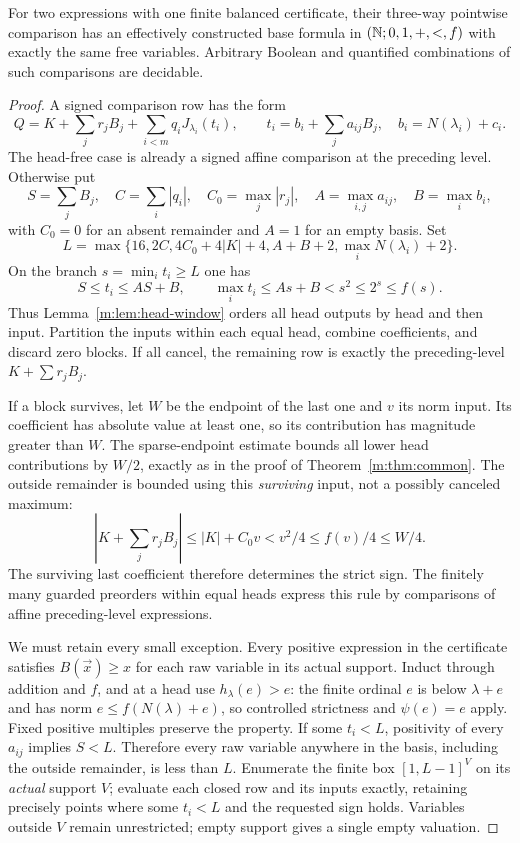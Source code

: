 \begin{theorem}\label{m:thm:balanced}
For two expressions with one finite balanced certificate, their three-way
pointwise comparison has an effectively constructed base formula in
$(\mathbb N;0,1,+,<,f)$ with exactly the same free variables. Arbitrary Boolean
and quantified combinations of such comparisons are decidable.
\end{theorem}
\begin{proof}
A signed comparison row has the form
\begin{equation}\label{m:eq:balanced-row}
 Q=K+\sum_jr_jB_j+\sum_{i<m}q_iJ_{\lambda_i}(t_i),\qquad
 t_i=b_i+\sum_j a_{ij}B_j,\quad b_i=N(\lambda_i)+c_i.
\end{equation}
The head-free case is already a signed affine comparison at the preceding
level. Otherwise put
\[
 S=\sum_jB_j,\quad C=\sum_i|q_i|,\quad C_0=\max_j|r_j|,
 \quad A=\max_{i,j}a_{ij},\quad B=\max_i b_i,
\]
with $C_0=0$ for an absent remainder and $A=1$ for an empty basis. Set
\begin{equation}\label{m:eq:balanced-L}
 L=\max\{16,2C,4C_0+4|K|+4,A+B+2,\max_iN(\lambda_i)+2\}.
\end{equation}
On the branch $s=\min_i t_i\ge L$ one has
\[
 S\le t_i\le AS+B,\qquad
 \max_i t_i\le As+B<s^2\le2^s\le f(s).
\]
Thus Lemma~\ref{m:lem:head-window} orders all head outputs by head and then
input. Partition the inputs within each equal head, combine coefficients,
and discard zero blocks. If all cancel, the remaining row is exactly the
preceding-level $K+\sum r_jB_j$.

If a block survives, let $W$ be the endpoint of the last one and $v$ its
norm input. Its coefficient has absolute value at least one, so its
contribution has magnitude greater than $W$. The sparse-endpoint estimate
bounds all lower head contributions by $W/2$, exactly as in the proof of
Theorem~\ref{m:thm:common}. The outside remainder is bounded using this
\emph{surviving} input, not a possibly canceled maximum:
\[
 \left|K+\sum_jr_jB_j\right|\le |K|+C_0v
          <v^2/4\le f(v)/4\le W/4.
\]
The surviving last coefficient therefore determines the strict sign.
The finitely many guarded preorders within equal heads express this rule
by comparisons of affine preceding-level expressions.

We must retain every small exception. Every positive expression in the
certificate satisfies $B(\vec x)\ge x$ for each raw variable in its
actual support. Induct through addition and $f$, and at a head use
$h_\lambda(e)>e$: the finite ordinal $e$ is below $\lambda+e$ and has
norm $e\le f(N(\lambda)+e)$, so controlled strictness and $\psi(e)=e$
apply. Fixed positive multiples preserve the property. If some $t_i<L$,
positivity of every $a_{ij}$ implies $S<L$. Therefore every raw variable
anywhere in the basis, including the outside remainder, is less than $L$.
Enumerate the finite box $[1,L-1]^V$ on its \emph{actual} support $V$;
evaluate each closed row and its inputs exactly, retaining precisely
points where some $t_i<L$ and the requested sign holds. Variables outside
$V$ remain unrestricted; empty support gives a single empty valuation.


\end{proof}
